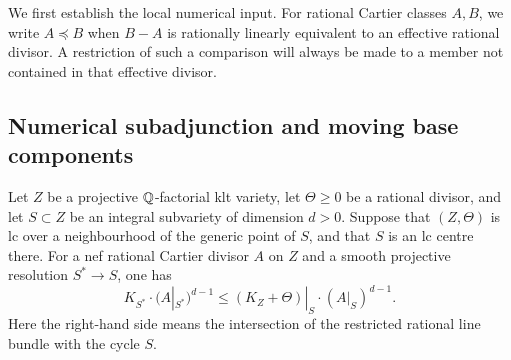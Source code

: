 We first establish the local numerical input.  For rational Cartier
classes $A,B$, we write $A\preceq B$ when $B-A$ is rationally linearly
equivalent to an effective rational divisor.  A restriction of such a
comparison will always be made to a member not contained in that effective
divisor.

\subsection{Numerical subadjunction and moving base components}

\begin{lemma}
\label{lem:scalar-subadjunction}
Let $Z$ be a projective $\mathbb Q$-factorial klt variety, let $\Theta\ge0$ be a
rational divisor, and let $S\subset Z$ be an integral subvariety of
dimension $d>0$.  Suppose that $(Z,\Theta)$ is lc over a neighbourhood of
the generic point of $S$, and that $S$ is an lc centre there.  For a nef
rational Cartier divisor $A$ on $Z$ and a smooth projective resolution
$S^*\to S$, one has
\begin{equation}\label{eq:scalar-subadjunction}
 K_{S^*}\cdot(A|_{S^*})^{d-1}
 \le (K_Z+\Theta)|_S\cdot(A|_S)^{d-1}.
\end{equation}
Here the right-hand side means the intersection of the restricted
rational line bundle with the cycle $S$.
\end{lemma}

